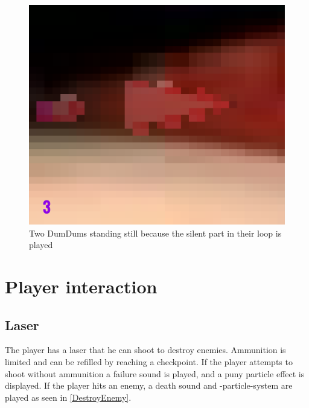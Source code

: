\begin{figure}[p]
  \centering
  \includegraphics[height=\imgWidth]{images/game_systems/2DumDums.png}
  \caption{Two DumDums standing still because the silent part in their loop is played}
  \label{Beatmover}
\end{figure}


\section{Player interaction}
\subsection{Laser}
The player has a laser that he can shoot to destroy enemies. Ammunition is limited and can be refilled by reaching a checkpoint. If the player attempts to shoot without ammunition a failure sound is played, and a puny particle effect is displayed. If the player hits an enemy, a death sound and -particle-system are played as seen in \cref{DestroyEnemy}.

